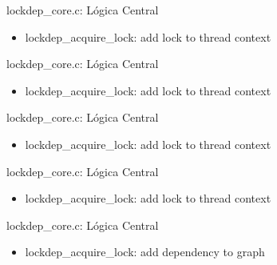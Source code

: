 \documentclass{beamer}
\newcommand{\cCore}{../../src/lockdep/lockdep_core.c}
\begin{document}
\begin{frame}{lockdep_core.c: Lógica Central}
  \begin{itemize}
    \item lockdep_acquire_lock: add lock to thread context
  \end{itemize}
  
  
  
\end{frame}

\begin{frame}{lockdep_core.c: Lógica Central}
  \begin{itemize}
    \item lockdep_acquire_lock: add lock to thread context
  \end{itemize}
  
\end{frame}

\begin{frame}{lockdep_core.c: Lógica Central}
  \begin{itemize}
    \item lockdep_acquire_lock: add lock to thread context
  \end{itemize}
  
  
  
\end{frame}

\begin{frame}{lockdep_core.c: Lógica Central}
  \begin{itemize}
    \item lockdep_acquire_lock: add lock to thread context
  \end{itemize}
  
\end{frame}

\begin{frame}{lockdep_core.c: Lógica Central}
  \begin{itemize}
    \item lockdep_acquire_lock: add dependency to graph
  \end{itemize}
  
\end{frame}
\end{document}
